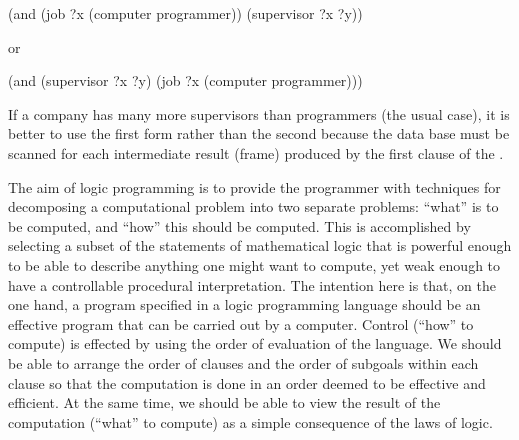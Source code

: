 \begin{codeBlock}
(and (job ?x (computer programmer)) (supervisor ?x ?y))
\end{codeBlock}

\noindent
or

\begin{codeBlock}
(and (supervisor ?x ?y) (job ?x (computer programmer)))
\end{codeBlock}

\noindent
If a company has many more supervisors than programmers (the usual case), it is
better to use the first form rather than the second because the data base must
be scanned for each intermediate result (frame) produced by the first clause of
the .

The aim of logic programming is to provide the programmer with techniques for
decomposing a computational problem into two separate problems: ``what'' is to
be computed, and ``how'' this should be computed.  This is accomplished by
selecting a subset of the statements of mathematical logic that is powerful
enough to be able to describe anything one might want to compute, yet weak
enough to have a controllable procedural interpretation.  The intention here is
that, on the one hand, a program specified in a logic programming language
should be an effective program that can be carried out by a computer.  Control
(``how'' to compute) is effected by using the order of evaluation of the
language.  We should be able to arrange the order of clauses and the order of
subgoals within each clause so that the computation is done in an order deemed
to be effective and efficient.  At the same time, we should be able to view the
result of the computation (``what'' to compute) as a simple consequence of the
laws of logic.

